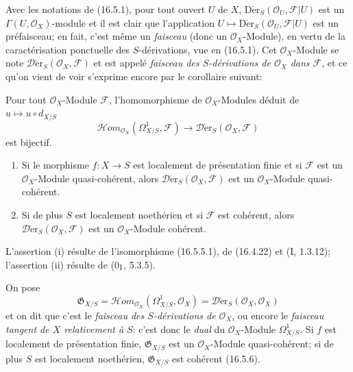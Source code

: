 \begin{env}[16.5.4]
Avec les notations de (16.5.1), pour tout ouvert $U$ de $X$,
$\operatorname{D\acute{e}r}_S(\mathcal{O}_U,\mathscr{F}|U)$ est un
$\Gamma(U,\mathcal{O}_X)$-module et il est clair que l'application
$U\mapsto\operatorname{D\acute{e}r}_S(\mathcal{O}_U,\mathscr{F}|U)$ est un
préfaisceau; en fait, c'est même un \emph{faisceau} (donc un
$\mathcal{O}_X$-Module), en vertu de la caractérisation ponctuelle des
$S$-dérivations, vue en (16.5.1). Cet $\mathcal{O}_X$-Module se note
$\mathscr{D}\!\mathrm{\acute{e}r}_S(\mathcal{O}_X,\mathscr{F})$ et est appelé
\emph{faisceau des $S$-dérivations de $\mathcal{O}_X$ dans $\mathscr{F}$}, et
ce qu'on vient de voir s'exprime encore par le corollaire suivant:
\end{env}

\begin{corollary}[16.5.5]
\label{IV.16.5.5}
Pour tout $\mathcal{O}_X$-Module $\mathscr{F}$, l'homomorphisme de
$\mathcal{O}_X$-Modules déduit de $u\mapsto u\circ d_{X/S}$
\[
  \mathscr{H}\!om_{\mathcal{O}_X}(\Omega_{X/S}^1,\mathscr{F})
  \longrightarrow
  \mathscr{D}\!\mathrm{\acute{e}r}_S(\mathcal{O}_X,\mathscr{F})
  \tag{16.5.5.1}
  \label{IV.16.5.5.1}
\]
est bijectif.
\end{corollary}

\begin{corollary}[16.5.6]
\label{IV.16.5.6}
\begin{enumerate}
\item[(i)] Si le morphisme $f:X\to S$ est localement de présentation finie et
si $\mathscr{F}$ est un $\mathcal{O}_X$-Module quasi-cohérent, alors
$\mathscr{D}\!\mathrm{\acute{e}r}_S(\mathcal{O}_X,\mathscr{F})$ est un
$\mathcal{O}_X$-Module quasi-cohérent.
\item[(ii)] Si de plus $S$ est localement noethérien et si $\mathscr{F}$ est
cohérent, alors $\mathscr{D}\!\mathrm{\acute{e}r}_S(\mathcal{O}_X,\mathscr{F})$ est un
$\mathcal{O}_X$-Module cohérent.
\end{enumerate}
\end{corollary}

L'assertion (i) résulte de l'isomorphisme (16.5.5.1), de (16.4.22) et
(I, 1.3.12); l'assertion (ii) résulte de (0$_{\rm I}$, 5.3.5).

\begin{env}[16.5.7]
On pose
\[
  \mathfrak{G}_{X/S}=
  \mathscr{H}\!om_{\mathcal{O}_X}(\Omega_{X/S}^1,\mathcal{O}_X)
  =\mathscr{D}\!\mathrm{\acute{e}r}_S(\mathcal{O}_X,\mathcal{O}_X)
  \tag{16.5.7.1}
  \label{IV.16.5.7.1}
\]
et on dit que c'est le \emph{faisceau des $S$-dérivations de
$\mathcal{O}_X$}, ou encore le \emph{faisceau tangent de $X$ relativement à
$S$}: c'est donc le \emph{dual} du $\mathcal{O}_X$-Module
$\Omega_{X/S}^1$. Si $f$ est localement de présentation
finie, $\mathfrak{G}_{X/S}$ est un $\mathcal{O}_X$-Module quasi-cohérent; si
de plus $S$ est localement noethérien, $\mathfrak{G}_{X/S}$ est cohérent
(16.5.6).
\end{env}

